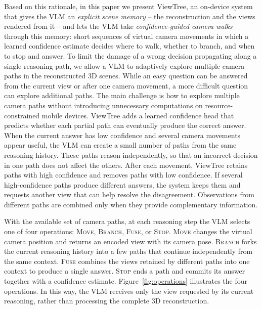 \documentclass[sigconf,10pt]{acmart}
\newcommand{\system}{ViewTree\xspace}
\begin{document}
	Based on this rationale, in this paper we present \system, an on-device system that gives the VLM an \emph{explicit scene memory} -- the reconstruction and the views rendered from it -- and lets the VLM take \emph{confidence-guided camera walks} through this memory: short sequences of virtual camera movements in which a learned confidence estimate decides where to walk, whether to branch, and when to stop and answer. To limit the damage of a wrong decision propagating along a single reasoning path, we allow a VLM to adaptively explore multiple camera paths in the reconstructed 3D scenes. While an easy question can be answered from the current view or after one camera movement, a more difficult question can explore additional paths. The main challenge is how to explore multiple camera paths without introducing unnecessary computations on resource-constrained mobile devices. \system adds a learned confidence head that predicts whether each partial path can eventually produce the correct answer. When the current answer has low confidence and several camera movements appear useful, the VLM can create a small number of paths from the same reasoning history. These paths reason independently, so that an incorrect decision in one path does not affect the others. After each movement, \system retains paths with high confidence and removes paths with low confidence. If several high-confidence paths produce different answers, the system keeps them and requests another view that can help resolve the disagreement. Observations from different paths are combined only when they provide complementary information. %
	
	With the available set of camera paths, at each reasoning step the VLM selects one of four operations: \textsc{Move}, \textsc{Branch}, \textsc{Fuse}, or \textsc{Stop}. \textsc{Move} changes the virtual camera position and returns an encoded view with its camera pose. \textsc{Branch} forks the current reasoning history into a few paths that continue independently from the same context. \textsc{Fuse} combines the views retained by different paths into one context to produce a single answer. \textsc{Stop} ends a path and commits its answer together with a confidence estimate. Figure~\ref{fig:operations} illustrates the four operations. In this way, the VLM receives only the view requested by its current reasoning, rather than processing the complete 3D reconstruction.
\end{document}
